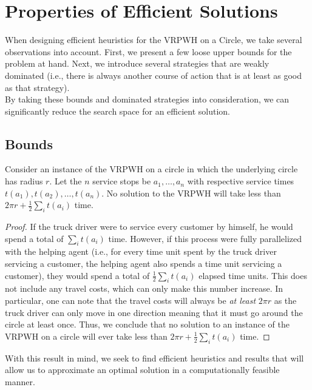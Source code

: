 \documentclass[12pt]{scrartcl}
\begin{document}
\section{Properties of Efficient Solutions}
When designing efficient heuristics for the VRPWH on a Circle, we take several observations into account. First, we present a few loose upper bounds for the problem at hand. Next, we introduce several strategies that are weakly dominated (i.e., there is always another course of action that is at least as good as that strategy). \\

By taking these bounds and dominated strategies into consideration, we can significantly reduce the search space for an efficient solution. 

\subsection{Bounds}

\begin{proposition}
Consider an instance of the VRPWH on a circle in which the underlying circle has radius $r$. Let the $n$ service stops be $a_1, \ldots, a_n$ with respective service times $t(a_1), t(a_2), \ldots, t(a_n)$. No solution to the VRPWH will take less than $2\pi r + \frac{1}{2}\sum_{i} t(a_i)$ time.
\end{proposition}
\begin{proof}
If the truck driver were to service every customer by himself, he would spend a total of $\sum_{i} t(a_i)$ time. However, if this process were fully parallelized with the helping agent (i.e., for every time unit spent by the truck driver servicing a customer, the helping agent also spends a time unit servicing a customer), they would spend a total of $\frac{1}{2} \sum_{i} t(a_i)$ elapsed time units. This does not include any travel costs, which can only make this number increase. In particular, one can note that the travel costs will always be \textit{at least} $2\pi r$ as the truck driver can only move in one direction meaning that it must go around the circle at least once. Thus, we conclude that no solution to an instance of the VRPWH on a circle will ever take less than $2\pi r + \frac{1}{2}\sum_{i} t(a_i)$ time. 
\end{proof}

With this result in mind, we seek to find efficient heuristics and results that will allow us to approximate an optimal solution in a computationally feasible manner.
\end{document}
